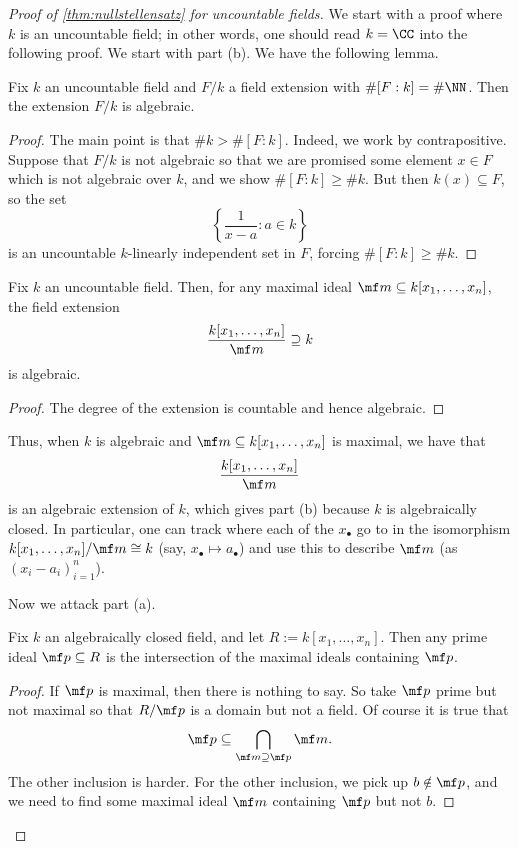 \begin{proof}[Proof of \autoref{thm:nullstellensatz} for uncountable fields]
	We start with a proof where $k$ is an uncountable field; in other words, one should read $k=\CC$ into the following proof. We start with part (b). We have the following lemma.
	\begin{lemma}
		Fix $k$ an uncountable field and $F/k$ a field extension with $\#[F:k]=\#\NN$. Then the extension $F/k$ is algebraic.
	\end{lemma}
	\begin{proof}
		The main point is that $\#k>\#[F:k]$. Indeed, we work by contrapositive. Suppose that $F/k$ is not algebraic so that we are promised some element $x\in F$ which is not algebraic over $k$, and we show $\#[F:k]\ge\#k$. But then $k(x)\subseteq F$, so the set
		\[\left\{\frac1{x-a}:a\in k\right\}\]
		is an uncountable $k$-linearly independent set in $F$, forcing $\#[F:k]\ge\#k$.
	\end{proof}
	\begin{corollary}
		Fix $k$ an uncountable field. Then, for any maximal ideal $\mf m\subseteq k[x_1,\ldots,x_n]$, the field extension
		\[\frac{k[x_1,\ldots,x_n]}{\mf m}\supseteq k\]
		is algebraic.
	\end{corollary}
	\begin{proof}
		The degree of the extension is countable and hence algebraic.
	\end{proof}
	Thus, when $k$ is algebraic and $\mf m\subseteq k[x_1,\ldots,x_n]$ is maximal, we have that
	\[\frac{k[x_1,\ldots,x_n]}{\mf m}\]
	is an algebraic extension of $k$, which gives part (b) because $k$ is algebraically closed. In particular, one can track where each of the $x_\bullet$ go to in the isomorphism $k[x_1,\ldots,x_n]/\mf m\cong k$ (say, $x_\bullet\mapsto a_\bullet$) and use this to describe $\mf m$ (as $(x_i-a_i)_{i=1}^n$).

	Now we attack part (a).
	\begin{lemma} \label{lem:betterjacobson}
		Fix $k$ an algebraically closed field, and let $R:=k[x_1,\ldots,x_n]$. Then any prime ideal $\mf p\subseteq R$ is the intersection of the maximal ideals containing $\mf p$.
	\end{lemma}
	\begin{proof}
		If $\mf p$ is maximal, then there is nothing to say. So take $\mf p$ prime but not maximal so that $R/\mf p$ is a domain but not a field. Of course it is true that
		\[\mf p\subseteq\bigcap_{\mf m\supseteq\mf p}\mf m.\]
		The other inclusion is harder. For the other inclusion, we pick up $b\notin\mf p$, and we need to find some maximal ideal $\mf m$ containing $\mf p$ but not $b$.


\end{proof}
\end{proof}

